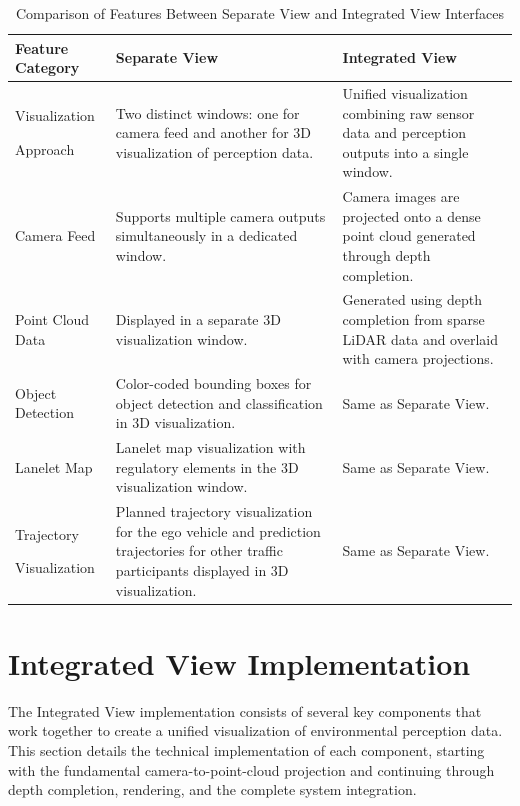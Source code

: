 \begin{table}[h!]
    \centering
    \begin{tabular}{@{}p{3cm}p{5.3cm}p{5.3cm}@{}}
    \toprule
    \textbf{Feature Category} & \textbf{Separate View} & \textbf{Integrated View} \\
    \midrule
    Visualization \par Approach & Two distinct windows: one for camera feed and another for 3D visualization of perception data. & Unified visualization combining raw sensor data and perception outputs into a single window. \\
    \midrule
    Camera Feed & Supports multiple camera outputs simultaneously in a dedicated window. & Camera images are projected onto a dense point cloud generated through depth completion. \\
    \midrule
    Point Cloud Data & Displayed in a separate 3D visualization window. & Generated using depth completion from sparse \ac{LiDAR} data and overlaid with camera projections. \\
    \midrule
    Object Detection & Color-coded bounding boxes for object detection and classification in 3D visualization. & Same as Separate View. \\
    \midrule
    Lanelet Map & Lanelet map visualization with regulatory elements in the 3D visualization window. & Same as Separate View. \\
    \midrule
    Trajectory \par Visualization & Planned trajectory visualization for the ego vehicle and prediction trajectories for other traffic participants displayed in 3D visualization. & Same as Separate View. \\
    \bottomrule
    \end{tabular}
    \caption{Comparison of Features Between Separate View and Integrated View Interfaces}
    \label{table:interface_features}
    \end{table}


\section{Integrated View Implementation}\label{section:integratedviewimplementation}

The Integrated View implementation consists of several key components that work together to create a unified visualization of environmental perception data. This section details the technical implementation of each component, starting with the fundamental camera-to-point-cloud projection and continuing through depth completion, rendering, and the complete system integration.

